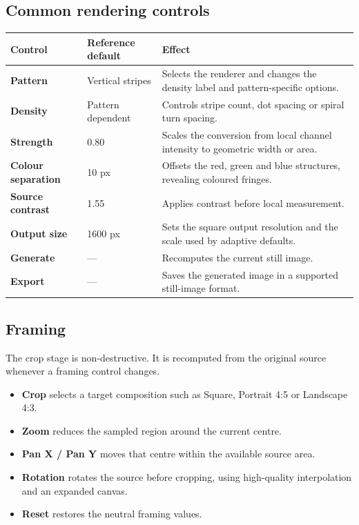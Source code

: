 \documentclass[10.5pt,a4paper]{article}
\begin{document}
\subsection{Common rendering controls}
\begin{tabularx}{\linewidth}{@{}>{\bfseries}p{31mm}p{29mm}X@{}}
\toprule
Control & Reference default & Effect \\
\midrule
Pattern & Vertical stripes & Selects the renderer and changes the density label and pattern-specific options. \\
Density & Pattern dependent & Controls stripe count, dot spacing or spiral turn spacing. \\
Strength & 0.80 & Scales the conversion from local channel intensity to geometric width or area. \\
Colour separation & 10 px & Offsets the red, green and blue structures, revealing coloured fringes. \\
Source contrast & 1.55 & Applies contrast before local measurement. \\
Output size & 1600 px & Sets the square output resolution and the scale used by adaptive defaults. \\
Generate & --- & Recomputes the current still image. \\
Export & --- & Saves the generated image in a supported still-image format. \\
\bottomrule
\end{tabularx}

\subsection{Framing}
The crop stage is non-destructive. It is recomputed from the original source whenever a framing control changes.

\begin{itemize}
\item \textbf{Crop} selects a target composition such as Square, Portrait 4:5 or Landscape 4:3.
\item \textbf{Zoom} reduces the sampled region around the current centre.
\item \textbf{Pan X / Pan Y} moves that centre within the available source area.
\item \textbf{Rotation} rotates the source before cropping, using high-quality interpolation and an expanded canvas.
\item \textbf{Reset} restores the neutral framing values.
\end{itemize}
\end{document}
